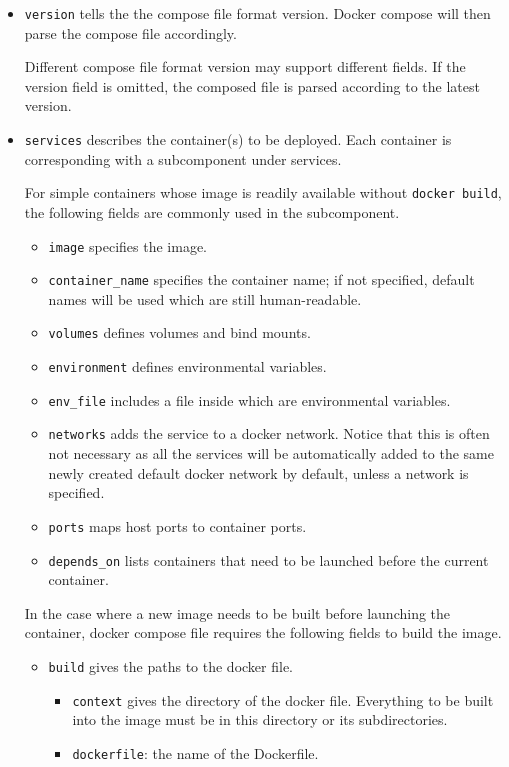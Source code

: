 \begin{itemize}
	\item \verb|version| tells the the compose file format version. Docker compose will then parse the compose file accordingly. 
	
	Different compose file format version may support different fields. If the version field is omitted, the composed file is parsed according to the latest version.
	
	\item \verb|services| describes the container(s) to be deployed. Each container is corresponding with a subcomponent under services.
	
	For simple containers whose image is readily available without \verb|docker build|, the following fields are commonly used in the subcomponent.
	
	\begin{itemize}
		\item \verb|image| specifies the image.
		\item \verb|container_name| specifies the container name; if not specified, default names will be used which are still human-readable.
		\item \verb|volumes| defines volumes and bind mounts.
		\item \verb|environment| defines environmental variables. 
		\item \verb|env_file| includes a file inside which are environmental variables.
		\item \verb|networks| adds the service to a docker network. Notice that this is often not necessary as all the services will be automatically added to the same newly created default docker network by default, unless a network is specified.
		\item \verb|ports| maps host ports to container ports.
		\item \verb|depends_on| lists containers that need to be launched before the current container.
	\end{itemize}
	
	In the case where a new image needs to be built before launching the container, docker compose file requires the following fields to build the image.
	
	\begin{itemize}
		\item \verb|build| gives the paths to the docker file.
		
		\begin{itemize}
			\item \verb|context| gives the directory of the docker file. Everything to be built into the image must be in this directory or its subdirectories.
			\item \verb|dockerfile|: the name of the Dockerfile.
		\end{itemize}
		

\end{itemize}
\end{itemize}
